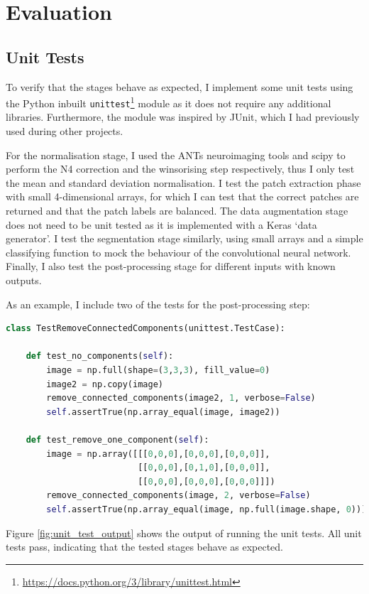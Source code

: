 \documentclass[12pt,a4paper,twoside,openright]{report}
\begin{document}
\chapter{Evaluation}

\section{Unit Tests}
To verify that the stages behave as expected, I implement some unit tests using the Python inbuilt \texttt{unittest}\footnote{\url{https://docs.python.org/3/library/unittest.html}} module as it does not require any additional libraries. Furthermore, the module was inspired by JUnit, which I had previously used during other projects.

 For the normalisation stage, I used the ANTs neuroimaging tools and scipy to perform the N4 correction and the winsorising step respectively, thus I only test the mean and standard deviation normalisation. I test the patch extraction phase with small 4-dimensional arrays, for which I can test that the correct patches are returned and that the patch labels are balanced. The data augmentation stage does not need to be unit tested as it is implemented with a Keras `data generator'. I test the segmentation stage similarly, using small arrays and a simple classifying function to mock the behaviour of the convolutional neural network. Finally, I also test the post-processing stage for different inputs with known outputs.
 
As an example, I include two of the tests for the post-processing step:
\begin{lstlisting}[language=Python]
	class TestRemoveConnectedComponents(unittest.TestCase):

    def test_no_components(self):
        image = np.full(shape=(3,3,3), fill_value=0)
        image2 = np.copy(image)
        remove_connected_components(image2, 1, verbose=False)
        self.assertTrue(np.array_equal(image, image2))
    
    def test_remove_one_component(self):
        image = np.array([[[0,0,0],[0,0,0],[0,0,0]],
                          [[0,0,0],[0,1,0],[0,0,0]],
                          [[0,0,0],[0,0,0],[0,0,0]]])
        remove_connected_components(image, 2, verbose=False)
        self.assertTrue(np.array_equal(image, np.full(image.shape, 0)))
\end{lstlisting}

Figure \ref{fig:unit_test_output} shows the output of running the unit tests. All unit tests pass, indicating that the tested stages behave as expected.
\end{document}
